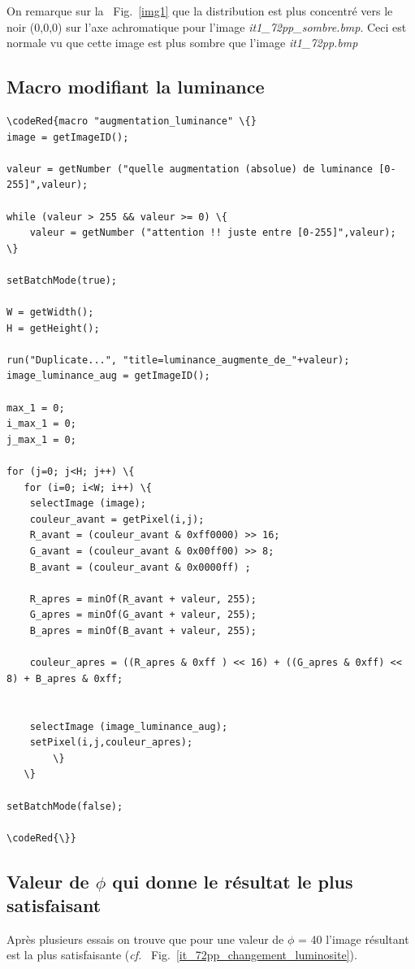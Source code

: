 \documentclass[a4paper,10pt]{article}
\begin{document}
On remarque sur la ~Fig.~\ref{img1} que la distribution est plus concentr\'e vers le noir (0,0,0) sur l'axe achromatique pour l'image \emph{it1\_72pp\_sombre.bmp}. Ceci est normale vu que cette image est plus sombre que l'image \emph{it1\_72pp.bmp}

\newpage

\subsection{Macro modifiant la luminance}
\begin{Verbatim}[commandchars=\\\{\}]
\codeRed{macro "augmentation_luminance" \{}
image = getImageID();

valeur = getNumber ("quelle augmentation (absolue) de luminance [0-255]",valeur);

while (valeur > 255 && valeur >= 0) \{
	valeur = getNumber ("attention !! juste entre [0-255]",valeur);
\}

setBatchMode(true);

W = getWidth();
H = getHeight();

run("Duplicate...", "title=luminance_augmente_de_"+valeur);
image_luminance_aug = getImageID();

max_1 = 0; 
i_max_1 = 0;
j_max_1 = 0;

for (j=0; j<H; j++) \{
   for (i=0; i<W; i++) \{
	selectImage (image);
	couleur_avant = getPixel(i,j);
	R_avant = (couleur_avant & 0xff0000) >> 16;
	G_avant = (couleur_avant & 0x00ff00) >> 8;
	B_avant = (couleur_avant & 0x0000ff) ;
	
	R_apres = minOf(R_avant + valeur, 255);
	G_apres = minOf(G_avant + valeur, 255);
	B_apres = minOf(B_avant + valeur, 255);

	couleur_apres = ((R_apres & 0xff ) << 16) + ((G_apres & 0xff) << 8) + B_apres & 0xff;


	selectImage (image_luminance_aug);
	setPixel(i,j,couleur_apres);
      	\}
   \}

setBatchMode(false);

\codeRed{\}}
\end{Verbatim}


\subsection{Valeur de $\phi$ qui donne le r\'esultat le plus satisfaisant}

Apr\`es plusieurs essais on trouve que pour une valeur de $\phi$ = 40 l'image r\'esultant est la plus satisfaisante (\emph{cf.} ~Fig.~\ref{it_72pp_changement_luminosite}).
\end{document}
